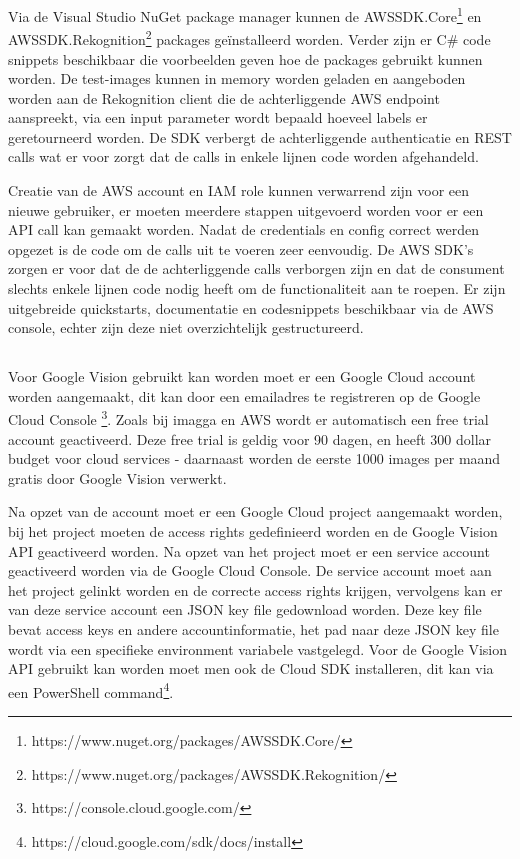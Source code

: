 Via de Visual Studio NuGet package manager kunnen de AWSSDK.Core\footnote{https://www.nuget.org/packages/AWSSDK.Core/} en AWSSDK.Rekognition\footnote{https://www.nuget.org/packages/AWSSDK.Rekognition/} packages geïnstalleerd worden. Verder zijn er C\# code snippets beschikbaar die voorbeelden geven hoe de packages gebruikt kunnen worden. De test-images kunnen in memory worden geladen en aangeboden worden aan de Rekognition client die de achterliggende AWS endpoint aanspreekt, via een input parameter wordt bepaald hoeveel labels er geretourneerd worden. De SDK verbergt de achterliggende authenticatie en REST calls wat er voor zorgt dat de calls in enkele lijnen code worden afgehandeld.

Creatie van de AWS account en IAM role kunnen verwarrend zijn voor een nieuwe gebruiker, er moeten meerdere stappen uitgevoerd worden voor er een API call kan gemaakt worden. Nadat de credentials en config correct werden opgezet is de code om de calls uit te voeren zeer eenvoudig. De AWS SDK's zorgen er voor dat de de achterliggende calls verborgen zijn en dat de consument slechts enkele lijnen code nodig heeft om de functionaliteit aan te roepen. Er zijn uitgebreide quickstarts, documentatie en codesnippets beschikbaar via de AWS console, echter zijn deze niet overzichtelijk gestructureerd.

\subsection{}
\label{sec:integration-google}
Voor Google Vision gebruikt kan worden moet er een Google Cloud account worden aangemaakt, dit kan door een emailadres te registreren op de Google Cloud Console \footnote{https://console.cloud.google.com/}. Zoals bij imagga en AWS wordt er automatisch een free trial account geactiveerd. Deze free trial is geldig voor 90 dagen, en heeft 300 dollar budget voor cloud services - daarnaast worden de eerste 1000 images per maand gratis door Google Vision verwerkt.

Na opzet van de account moet er een Google Cloud project aangemaakt worden, bij het project moeten de access rights gedefinieerd worden en de Google Vision API geactiveerd worden. Na opzet van het project moet er een service account geactiveerd worden via de Google Cloud Console. De service account moet aan het project gelinkt worden en de correcte access rights krijgen, vervolgens kan er van deze service account een JSON key file gedownload worden. Deze key file bevat access keys en andere accountinformatie, het pad naar deze JSON key file wordt via een specifieke environment variabele vastgelegd. Voor de Google Vision API gebruikt kan worden moet men ook de Cloud SDK installeren, dit kan via een PowerShell command\footnote{https://cloud.google.com/sdk/docs/install}.

